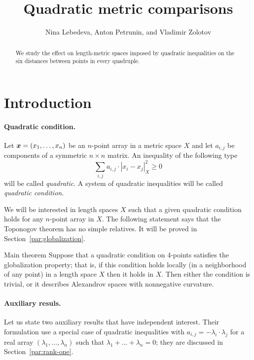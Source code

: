 \documentclass[a4paper,10pt]{article}
\def\thetitle{Quadratic metric comparisons}
\def\theauthors{Nina Lebedeva, Anton Petrunin, and Vladimir Zolotov}
\begin{document}

\title{\thetitle}
\author{\theauthors}
\date{}
\maketitle

\begin{abstract}
We study the effect on length-metric spaces imposed by quadratic inequalities on the six distances between points in every quadruple.
\end{abstract}

\section{Introduction}\label{par:quadratic-inq}

\paragraph{Quadratic condition.}
Let $\bm{x}\z=(x_1,\dots,x_n)$ be an $n$-point array in a metric space $X$ and let $a_{i,j}$ be components of a symmetric $n{\times}n$ matrix.
An inequality of the following type
\[\sum_{i,j}a_{i,j}\cdot|x_i-x_j|_X^2\ge 0\]
will be called \emph{quadratic}.
A system of quadratic inequalities will be called \emph{quadratic condition}.

We will be interested in length spaces $X$ such that a given quadratic condition holds for any $n$-point array in $X$.
The following statement says that the Toponogov theorem has no simple relatives.
It will be proved in Section~\ref{par:globalization}.

\begin{thm}{Main theorem}
Suppose that a quadratic condition on 4-points satisfies the globalization property;
that is, if this condition holds locally (in a neighborhood of any point) in a length space $X$ then it holds in $X$.
Then either the condition is trivial, or it describes Alexandrov spaces with nonnegative curvature.
\end{thm}


\paragraph{Auxiliary resuls.}
Let us state two auxiliary results that have independent interest.
Their formulation use a special case of quadratic inequalities
with $a_{i,j}=-\lambda_i\cdot\lambda_j$ for a real array $(\lambda_1,\dots, \lambda_n)$ such that $\lambda_1+\dots+\lambda_n=0$; they are discussed in Section~\ref{par:rank-one}.
\end{document}
